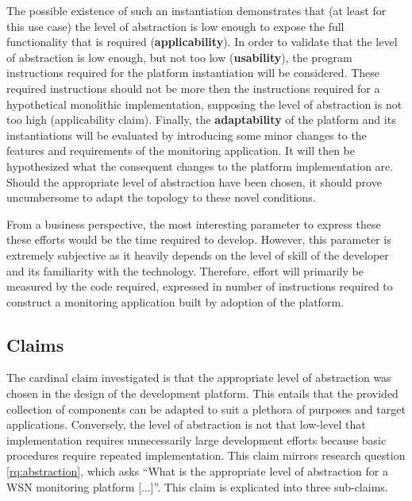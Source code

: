 The possible existence of such an instantiation demonstrates that (at least for this use case) the level of abstraction is low enough to expose the full functionality that is required  (\textbf{applicability}). In order to validate that the level of abstraction is low enough, but not too low (\textbf{usability}), the program instructions required for the platform instantiation will be considered. These required instructions should not be more then the instructions required for a hypothetical monolithic implementation, supposing the level of abstraction is not too high (applicability claim). Finally, the \textbf{adaptability} of the platform and its instantiations will be evaluated by introducing some minor changes to the features and requirements of the monitoring application. It will then be hypothesized what the consequent changes to the platform implementation are. Should the appropriate level of abstraction have been chosen, it should prove uncumbersome to adapt the topology to these novel conditions.

From a business perspective, the most interesting parameter to express these these efforts would be the time required to develop. However, this parameter is extremely subjective as it heavily depends on the level of skill of the developer and its familiarity with the technology. Therefore, effort will primarily be measured by the code required, expressed in number of instructions required to construct a monitoring application built by adoption of the platform.

\subsection{Claims}
\label{sec:claims}
The cardinal claim investigated is that the appropriate level of abstraction was chosen in the design of the development platform. This entails that the provided collection of components can be adapted to suit a plethora of purposes and target applications. Conversely, the level of abstraction is not that low-level that implementation requires unnecessarily large development efforts because basic procedures require repeated implementation. This claim mirrors research question \ref{rq:abstraction}, which asks ``What is the appropriate level of abstraction for a WSN monitoring platform [...]''. This claim is explicated into three sub-claims.

